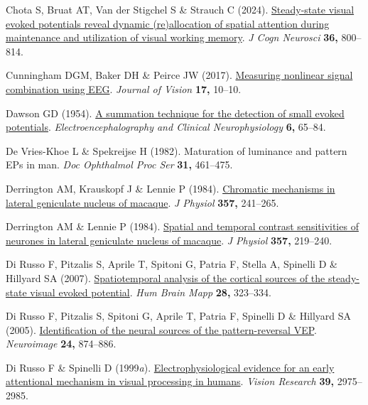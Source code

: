 \documentclass[
  letterpaper,
  DIV=11,
  numbers=noendperiod]{scrartcl}
\newlength{\cslhangindent}
\newenvironment{CSLReferences}[2] %
 {\begin{list}{}{%
  \setlength{\itemindent}{0pt}
  \setlength{\leftmargin}{0pt}
  \setlength{\parsep}{0pt}
  \ifodd #1
   \setlength{\leftmargin}{\cslhangindent}
   \setlength{\itemindent}{-1\cslhangindent}
  \fi
  \setlength{\itemsep}{#2\baselineskip}}}
 {\end{list}}
\begin{document}
\begin{CSLReferences}{1}{1}
Chota S, Bruat AT, Van der Stigchel S \& Strauch C (2024).
\href{https://doi.org/10.1162/jocn_a_02107}{Steady-state visual evoked
potentials reveal dynamic (re)allocation of spatial attention during
maintenance and utilization of visual working memory}. \emph{J Cogn
Neurosci} \textbf{36,} 800--814.

Cunningham DGM, Baker DH \& Peirce JW (2017).
\href{https://doi.org/10.1167/17.5.10}{{Measuring nonlinear signal
combination using EEG}}. \emph{Journal of Vision} \textbf{17,} 10--10.

Dawson GD (1954). \href{https://doi.org/10.1016/0013-4694(54)90007-3}{A
summation technique for the detection of small evoked potentials}.
\emph{Electroencephalography and Clinical Neurophysiology} \textbf{6,}
65--84.

De Vries-Khoe L \& Spekreijse H (1982). Maturation of luminance and
pattern EPs in man. \emph{Doc Ophthalmol Proc Ser} \textbf{31,}
461--475.

Derrington AM, Krauskopf J \& Lennie P (1984).
\href{https://doi.org/10.1113/jphysiol.1984.sp015499}{Chromatic
mechanisms in lateral geniculate nucleus of macaque}. \emph{J Physiol}
\textbf{357,} 241--265.

Derrington AM \& Lennie P (1984).
\href{https://doi.org/10.1113/jphysiol.1984.sp015498}{Spatial and
temporal contrast sensitivities of neurones in lateral geniculate
nucleus of macaque}. \emph{J Physiol} \textbf{357,} 219--240.

Di Russo F, Pitzalis S, Aprile T, Spitoni G, Patria F, Stella A,
Spinelli D \& Hillyard SA (2007).
\href{https://doi.org/10.1002/hbm.20276}{Spatiotemporal analysis of the
cortical sources of the steady-state visual evoked potential}. \emph{Hum
Brain Mapp} \textbf{28,} 323--334.

Di Russo F, Pitzalis S, Spitoni G, Aprile T, Patria F, Spinelli D \&
Hillyard SA (2005).
\href{https://doi.org/10.1016/j.neuroimage.2004.09.029}{Identification
of the neural sources of the pattern-reversal VEP}. \emph{Neuroimage}
\textbf{24,} 874--886.

Di Russo F \& Spinelli D (1999\emph{a}).
\href{https://doi.org/10.1016/S0042-6989(99)00031-0}{Electrophysiological
evidence for an early attentional mechanism in visual processing in
humans}. \emph{Vision Research} \textbf{39,} 2975--2985.


\end{CSLReferences}
\end{document}
